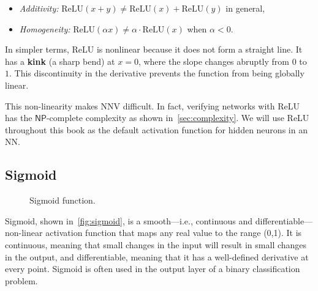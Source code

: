 \documentclass[oneside,11pt,dvipsnames]{book}
\numberwithin{equation}{section}
\theoremstyle{definition}
\theoremstyle{remark}
\newcommand{\relu}[1]{\mathrm{ReLU}\left(#1\right)}
\begin{document}
    \begin{itemize}
        \item \textit{Additivity:} $\relu{x + y} \ne \relu{x} + \text{ReLU}(y)$ in general,
        \item \textit{Homogeneity:} $\text{ReLU}(\alpha x) \ne \alpha \cdot \text{ReLU}(x)$ when $\alpha < 0$.
    \end{itemize}

In simpler terms, ReLU is nonlinear because it does not form a straight line.  It has a \textbf{kink} (a sharp bend) at $x = 0$, where the slope changes abruptly from $0$ to $1$. This discontinuity in the derivative prevents the function from being globally linear.


This non-linearity makes NNV difficult. In fact, verifying networks with ReLU has the $\mathsf{NP}$-complete complexity as shown in~\autoref{sec:complexity}. We will use ReLU throughout this book as the default activation function for hidden neurons in an NN.

\subsection{Sigmoid}\label{sec:sigmoid}



\begin{figure}[ht]
    \centering
    \caption{Sigmoid function.}\label{fig:sigmoid}
\end{figure}

Sigmoid, shown in~\autoref{fig:sigmoid}, is a smooth---i.e., continuous and differentiable---non-linear activation function that maps any real value to the range (0,1).
It is continuous, meaning that small changes in the input will result in small changes in the output, and differentiable, meaning that it has a well-defined derivative at every point. Sigmoid is often used in the output layer of a binary classification problem.
\end{document}
